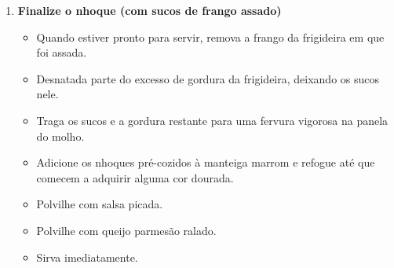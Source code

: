 \documentclass [11pt, letterpaper] {article}
\begin{document}
\begin {description}
\begin {enumerate}
\begin {itemize}
\item Polvilhe com salsa picada.
\item Polvilhe com queijo parmesão ralado.
\item Sirva imediatamente.
\end {itemize}
\item {\bf Finalize o nhoque (com sucos de frango assado)}
\begin {itemize}
\item Quando estiver pronto para servir, remova a frango da frigideira em que foi assada.
\item Desnatada parte do excesso de gordura da frigideira, deixando os sucos nele.
\item Traga os sucos e a gordura restante para uma fervura vigorosa na panela do molho.
\item Adicione os nhoques pré-cozidos à manteiga marrom e refogue até que comecem a adquirir alguma cor dourada.
\item Polvilhe com salsa picada.
\item Polvilhe com queijo parmesão ralado.
\item Sirva imediatamente.
\end {itemize}
\end {enumerate}

\end {description}
\end{document}

